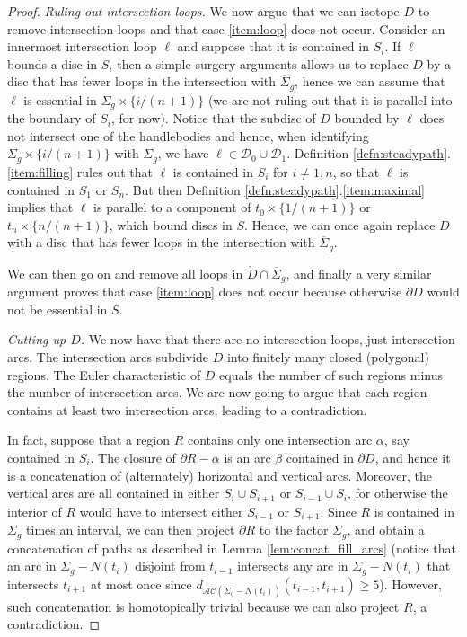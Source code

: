 \documentclass[11pt, oneside]{amsart}
\theoremstyle{definition}
\theoremstyle{definition}
\newcommand{\calD} {\ensuremath {\mathcal{D}}}
\begin{document}
\begin{proof}
 \emph{Ruling out intersection loops.} We now argue that we can isotope $D$ to remove intersection loops and that case \ref{item:loop} does not occur. Consider an innermost intersection loop $\ell$ and suppose that it is contained in $S_i$.  If $\ell$ bounds a disc in $S_i$ then a simple surgery arguments allows us to replace $D$ by a disc that has fewer loops in the intersection with $\overline\Sigma_g$, hence we can assume that $\ell$ is essential in $\Sigma_g\times\{i/(n+1)\}$ (we are not ruling out that it is parallel into the boundary of $S_i$, for now). Notice that the subdisc of $D$ bounded by $\ell$ does not intersect one of the handlebodies and hence, when identifying $\Sigma_g\times\{i/(n+1)\}$ with $\Sigma_g$, we have $\ell\in \calD_0\cup \calD_1$. Definition \ref{defn:steadypath}.\ref{item:filling} rules out that $\ell$ is contained in $S_i$ for $i\neq 1,n$, so that $\ell$ is contained in $S_1$ or $S_n$. But then Definition \ref{defn:steadypath}.\ref{item:maximal} implies that $\ell$ is parallel to a component of $t_0\times\{1/(n+1)\}$ or $t_n\times\{n/(n+1)\}$, which bound discs in $S$. Hence, we can once again replace $D$ with a disc that has fewer loops in the intersection with $\overline\Sigma_g$. 
 
 We can then go on and remove all loops in $\mathring D\cap \overline{\Sigma}_g$, and finally a very similar argument proves that case \ref{item:loop} does not occur because otherwise  $\partial D$ would not be essential in $S$.
 
 
\emph{Cutting up $D$.} We now have that there are no intersection loops, just intersection arcs.
The intersection arcs subdivide $D$ into finitely many closed (polygonal) regions. The Euler characteristic of $D$ equals the number of such regions minus the number of intersection arcs. We are now going to argue that each region contains at least two intersection arcs, leading to a contradiction.

In fact, suppose that a region $R$ contains only one intersection arc $\alpha$, say contained in $S_i$. The closure of $\partial R-\alpha$ is an arc $\beta$ contained in $\partial D$, and hence it is a concatenation of (alternately) horizontal and vertical arcs. Moreover, the vertical arcs are all contained in either $S_i\cup S_{i+1}$ or $S_{i-1}\cup S_i$, for otherwise the interior of $R$ would have to intersect either $S_{i-1}$ or $S_{i+1}$. Since $R$ is contained in $\Sigma_g$ times an interval, we can then project $\partial R$ to the factor $\Sigma_g$, and obtain a concatenation of paths as described in Lemma \ref{lem:concat_fill_arcs} (notice that an arc in $\Sigma_g-N(t_i)$ disjoint from $t_{i-1}$ intersects any arc in $\Sigma_g-N(t_i)$ that intersects $t_{i+1}$ at most once since $d_{\mathcal{AC}(\Sigma_g-N(t_i))}(t_{i-1},t_{i+1})\geq5$). However, such concatenation is homotopically trivial because we can also project $R$, a contradiction.
\end{proof}
\end{document}
